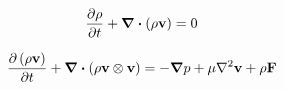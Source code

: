 \documentclass[a4paper, 11pt]{article}
\begin{document}
	
%

\clearpage	
\clearpage	

\[
	\pdv{\rho}{t} + \div(\rho \vb{v}) = 0
\]

\[
	\pdv{\left( \rho \vb{v} \right)}{t} + \div(\rho \vb{v} \otimes \vb{v}) = 
	-\grad{p} + \mu \laplacian{\vb{v}} + \rho \vb{F}
\]
\end{document}
